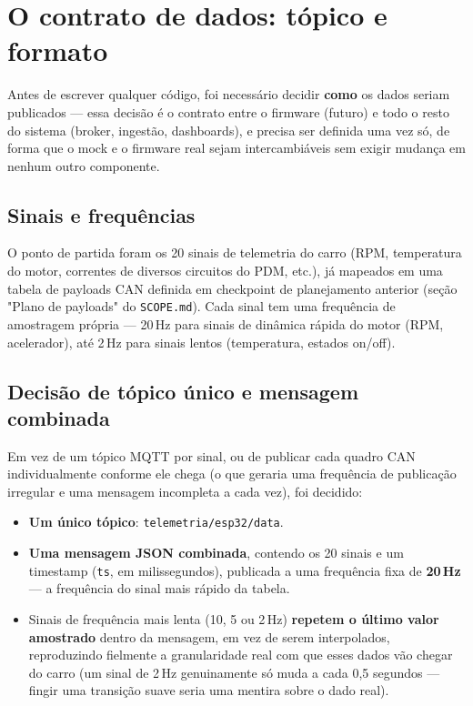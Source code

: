 \documentclass[11pt,a4paper]{article}
\begin{document}
\section{O contrato de dados: tópico e formato}

Antes de escrever qualquer código, foi necessário decidir \textbf{como} os dados seriam publicados --- essa decisão é o contrato entre o firmware (futuro) e todo o resto do sistema (broker, ingestão, dashboards), e precisa ser definida uma vez só, de forma que o mock e o firmware real sejam intercambiáveis sem exigir mudança em nenhum outro componente.

\subsection{Sinais e frequências}

O ponto de partida foram os 20 sinais de telemetria do carro (RPM, temperatura do motor, correntes de diversos circuitos do PDM, etc.), já mapeados em uma tabela de payloads CAN definida em checkpoint de planejamento anterior (seção "Plano de payloads" do \texttt{SCOPE.md}). Cada sinal tem uma frequência de amostragem própria --- 20\,Hz para sinais de dinâmica rápida do motor (RPM, acelerador), até 2\,Hz para sinais lentos (temperatura, estados on/off).

\subsection{Decisão de tópico único e mensagem combinada}

Em vez de um tópico MQTT por sinal, ou de publicar cada quadro CAN individualmente conforme ele chega (o que geraria uma frequência de publicação irregular e uma mensagem incompleta a cada vez), foi decidido:

\begin{itemize}
    \item \textbf{Um único tópico}: \texttt{telemetria/esp32/data}.
    \item \textbf{Uma mensagem JSON combinada}, contendo os 20 sinais e um timestamp (\texttt{ts}, em milissegundos), publicada a uma frequência fixa de \textbf{20\,Hz} --- a frequência do sinal mais rápido da tabela.
    \item Sinais de frequência mais lenta (10, 5 ou 2\,Hz) \textbf{repetem o último valor amostrado} dentro da mensagem, em vez de serem interpolados, reproduzindo fielmente a granularidade real com que esses dados vão chegar do carro (um sinal de 2\,Hz genuinamente só muda a cada 0,5 segundos --- fingir uma transição suave seria uma mentira sobre o dado real).
\end{itemize}
\end{document}
